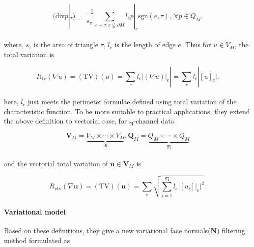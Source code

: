 \small{
\begin{equation}
 \label{eq:edgedivergence}
 (\textrm{div}p|_{\tau})=\frac{-1}{s_{\tau}}
 \sum_{e\prec\tau,e\nsubseteq \partial M}^{}
 l_{e} p|_{e} \textrm{sgn}(e, \tau),~\forall p\in Q_{M}.
\end{equation}
}
\\
where, $s_{\tau}$ is the area of triangle $\tau$, $l_{e}$ is the length of edge $e$.
Thus for $u\in V_{M}$, the total variation is

\small{
\begin{equation}
 \label{eq:elementtv}
 R_{\textrm{tv}}(\nabla u) = (\textrm{TV})(u)
 = \sum_{e}^{} l_{e} | (\nabla u)|_{e} |
 = \sum_{e}^{} l_{e} | [u]_{e} |.
\end{equation}
}
\\
here, $l_{e}$ just meets the perimeter formulae defined using total variation of the characteristic function. To be more suitable to practical applications, they extend the above definition to vectorial case, for $_{\mathfrak{N}}$-channel data

\small{
\begin{equation}
 \label{eq:vectorialspace}
 \mathbf{V}_{M} = \underbrace{V_{M}\times\cdots\times V_{M}}_{\mathfrak{N}},
 \mathbf{Q}_{M} = \underbrace{Q_{M}\times\cdots\times Q_{M}}_{\mathfrak{N}}
\end{equation}
}
\\
and the vectorial total variation of $\mathbf{u}\in\mathbf{V}_M$ is

\small{
\begin{equation}
 \label{eq:vectorialtv}
  R_{\textrm{vtv}}(\nabla \mathbf{u}) = (\textrm{TV})(\mathbf{u})
 = \sum_{e}^{}   \sqrt{\sum_{i=1}^{\mathfrak{N}}  l_{e} | [u_{i}]|_{e} |^2} .
\end{equation}
}

\paragraph{Variational model}
Based on these definitions, they give a new variational face normals($\mathbf{N}$) filtering method formulated as

